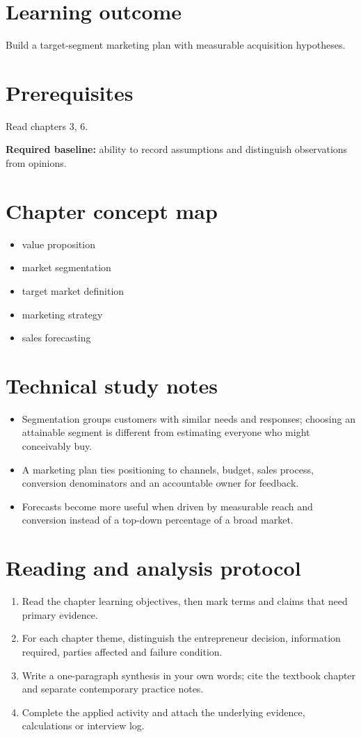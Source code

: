 \documentclass[11pt,letterpaper]{article}
\begin{document}
\SuiteOpen
\section{Learning outcome}
Build a target-segment marketing plan with measurable acquisition hypotheses.
\section{Prerequisites}
Read chapters 3, 6.\par\textbf{Required baseline:} ability to record assumptions and distinguish observations from opinions.
\section{Chapter concept map}
\begin{itemize}[leftmargin=*,itemsep=3pt]
\item value proposition
\item market segmentation
\item target market definition
\item marketing strategy
\item sales forecasting
\end{itemize}

\section{Technical study notes}
\begin{itemize}[leftmargin=*,itemsep=3pt]
\item Segmentation groups customers with similar needs and responses; choosing an attainable segment is different from estimating everyone who might conceivably buy.
\item A marketing plan ties positioning to channels, budget, sales process, conversion denominators and an accountable owner for feedback.
\item Forecasts become more useful when driven by measurable reach and conversion instead of a top-down percentage of a broad market.
\end{itemize}

\section{Reading and analysis protocol}
\begin{enumerate}[leftmargin=*,itemsep=5pt]
\item Read the chapter learning objectives, then mark terms and claims that need primary evidence.
\item For each chapter theme, distinguish the entrepreneur decision, information required, parties affected and failure condition.
\item Write a one-paragraph synthesis in your own words; cite the textbook chapter and separate contemporary practice notes.
\item Complete the applied activity and attach the underlying evidence, calculations or interview log.
\end{enumerate}
\end{document}
